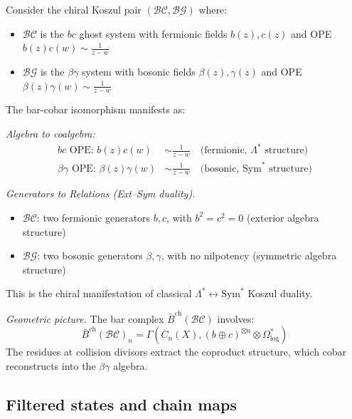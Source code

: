 \begin{example}
\label{ex:bc-betagamma-koszul}
Consider the chiral Koszul pair $(\mathcal{BC}, \mathcal{BG})$ where:
\begin{itemize}
\item $\mathcal{BC}$ is the $bc$ ghost system with fermionic fields $b(z), c(z)$ and OPE $b(z)c(w) \sim \frac{1}{z-w}$
\item $\mathcal{BG}$ is the $\beta\gamma$ system with bosonic fields $\beta(z), \gamma(z)$ and OPE $\beta(z)\gamma(w) \sim \frac{1}{z-w}$
\end{itemize}

The bar-cobar isomorphism manifests as:

\emph{Algebra to coalgebra:}
\begin{align*}
\text{$bc$ OPE: } b(z)c(w) &\sim \frac{1}{z-w} \quad \text{(fermionic, $\Lambda^*$ structure)} \\
\text{$\beta\gamma$ OPE: } \beta(z)\gamma(w) &\sim \frac{1}{z-w} \quad \text{(bosonic, $\mathrm{Sym}^*$ structure)}
\end{align*}

\emph{Generators to Relations (Ext--Sym duality).}
\begin{itemize}
\item $\mathcal{BC}$: two fermionic generators $b, c$, with $b^2 = c^2 = 0$ (exterior algebra structure)
\item $\mathcal{BG}$: two bosonic generators $\beta, \gamma$, with no nilpotency (symmetric algebra structure)
\end{itemize}
This is the chiral manifestation of classical $\Lambda^* \leftrightarrow \mathrm{Sym}^*$ Koszul duality.

\emph{Geometric picture.}
The bar complex $\bar{B}^{\text{ch}}(\mathcal{BC})$ involves:
\[\bar{B}^{\text{ch}}(\mathcal{BC})_n = \Gamma\left(\overline{C}_n(X), (b \oplus c)^{\boxtimes n} \otimes \Omega^*_{\log}\right)\]
The residues at collision divisors extract the coproduct structure, which cobar reconstructs into the $\beta\gamma$ algebra.
\end{example}

\subsection{Filtered states and chain maps}
\label{sec:koszulness-verification}


